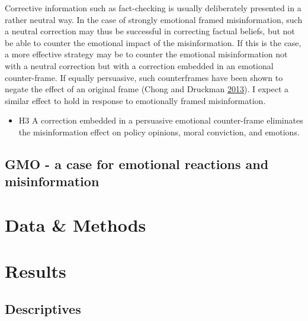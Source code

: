 \documentclass[
  12pt,
]{article}
\providecommand{\tightlist}{%
  \setlength{\itemsep}{0pt}\setlength{\parskip}{0pt}}
\begin{document}
Corrective information such as fact-checking is usually deliberately presented in a rather neutral way. In the case of strongly emotional framed misinformation, such a neutral correction may thus be successful in correcting factual beliefs, but not be able to counter the emotional impact of the misinformation. If this is the case, a more effective strategy may be to counter the emotional misinformation not with a neutral correction but with a correction embedded in an emotional counter-frame. If equally persuasive, such counterframes have been shown to negate the effect of an original frame (Chong and Druckman \protect\hyperlink{ref-chong2013counterframing}{2013}). I expect a similar effect to hold in response to emotionally framed misinformation.

\begin{itemize}
\tightlist
\item
  H3 A correction embedded in a persuasive emotional counter-frame eliminates the misinformation effect on policy opinions, moral conviction, and emotions.
\end{itemize}

\hypertarget{gmo---a-case-for-emotional-reactions-and-misinformation}{%
\subsection{GMO - a case for emotional reactions and misinformation}\label{gmo---a-case-for-emotional-reactions-and-misinformation}}

\hypertarget{data-methods}{%
\section{Data \& Methods}\label{data-methods}}

\hypertarget{results}{%
\section{Results}\label{results}}

\hypertarget{descriptives}{%
\subsection{Descriptives}\label{descriptives}}
\end{document}

